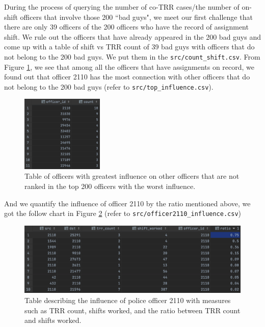 \documentclass[10pt]{article}
\begin{document}
During the process of querying the number of co-TRR cases/the number of on-shift officers that involve those 200 ``bad guys", we meet our first challenge that there are only 39 officers of the 200 officers who have the record of assignment shift. We rule out the officers that have already appeared in the 200 bad guys and come up with a table of shift vs TRR count of 39 bad guys with officers that do not belong to the 200 bad guys. We put them in the \texttt{src/count\_shift.csv}. From Figure \ref{shiftcount}, we see that among all the officers that have assignments on record, we found out that officer 2110 has the most connection with other officers that do not belong to the 200 bad guys (refer to \texttt{src/top\_influence.csv}).

\begin{figure}[H]
\centering
\includegraphics[width=0.35\textwidth]{shiftcount}
\caption{Table of officers with greatest influence on other officers that are not ranked in the top 200 officers with the worst influence.}
\label{shiftcount}
\end{figure}

And we quantify the influence of officer 2110 by the ratio mentioned above, we got the follow chart in Figure \ref{2110inf} (refer to \texttt{src/officer2110\_influence.csv})

\begin{figure}[H]
\centering
\includegraphics[width=\textwidth]{2110inf}
\caption{Table describing the influence of police officer 2110 with measures such as TRR count, shifts worked, and the ratio between TRR count and shifts worked.}
\label{2110inf}
\end{figure}
\end{document}
